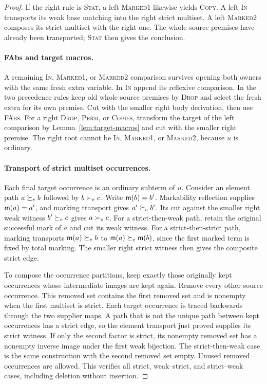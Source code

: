 \begin{proof}
If the right rule is \textsc{Stat}, a left
\textsc{Marked1} likewise yields \textsc{Copy}.
A left \textsc{In} transports its weak base
matching into the right strict multiset.
A left \textsc{Marked2} composes its strict
multiset with the right one. The whole-source
premises have already been transported;
\textsc{Stat} then gives the conclusion.

\paragraph{FAbs and target macros.}
A remaining \textsc{In}, \textsc{Marked1}, or
\textsc{Marked2} comparison survives opening
both owners with the same fresh extra variable.
In \textsc{In} append its reflexive comparison.
In the two precedence rules keep old
whole-source premises by \textsc{Drop} and
select the fresh extra for its own premise.
Cut with the smaller right body derivation,
then use \textsc{FAbs}.
For a right \textsc{Drop}, \textsc{Perm},
or \textsc{Copies}, transform the target of
the left comparison by
Lemma~\ref{lem:target-macros} and cut with
the smaller right premise.
The right root cannot be \textsc{In},
\textsc{Marked1}, or \textsc{Marked2},
because $u$ is ordinary.

\paragraph{Transport of strict multiset occurrences.}
Each final target occurrence is an ordinary
subterm of $u$. Consider an element path
$a\succeq_e b$ followed by $b\succ_e c$.
Write $\mathsf m(b)=b'$. Markability reflection
supplies $\mathsf m(a)=a'$, and marking transport
gives $a'\succeq_e b'$. Its cut against the
smaller right weak witness $b'\succeq_e c$ gives
$a\succ_e c$. For a strict-then-weak path,
retain the original successful mark of $a$
and cut its weak witness. For a
strict-then-strict path, marking transports
$\mathsf m(a)\succeq_e b$ to
$\mathsf m(a)\succeq_e \mathsf m(b)$, since the first
marked term is fixed by total marking.
The smaller right strict witness then
gives the composite strict edge.

To compose the occurrence partitions, keep
exactly those originally kept occurrences
whose intermediate images are kept again.
Remove every other source occurrence.
This removed set contains the first
removed set and is nonempty when the
first multiset is strict. Each target
occurrence is traced backwards through
the two supplier maps. A path that is
not the unique path between kept
occurrences has a strict edge, so the
element transport just proved supplies
its strict witness. If only the second
factor is strict, its nonempty removed
set has a nonempty inverse image under
the first weak bijection. The
strict-then-weak case is the same
construction with the second removed
set empty. Unused removed occurrences
are allowed. This verifies all strict,
weak--strict, and strict--weak cases,
including deletion without insertion.


\end{proof}
